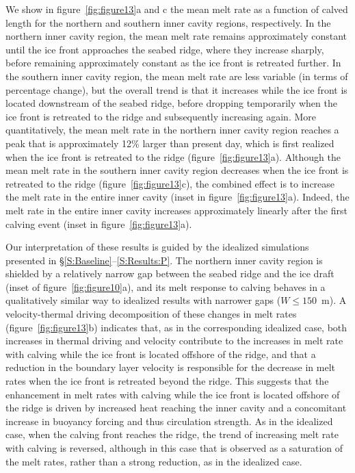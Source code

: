 \documentclass[draft]{agujournal2019}
\begin{document}
We show in figure~\ref{fig:figure13}a and c the mean melt rate as a function of calved length for the northern and southern inner cavity regions, respectively. In the northern inner cavity region, the mean melt rate remains approximately constant until the ice front approaches the seabed ridge, where they increase sharply, before remaining approximately constant as the ice front is retreated further. In the southern inner cavity region, the mean melt rate are less variable (in terms of percentage change), but the overall trend is that it increases while the ice front is located downstream of the seabed ridge, before dropping temporarily when the ice front is retreated to the ridge and subsequently increasing again.  More quantitatively, the mean melt rate in the northern inner cavity region reaches a peak that is approximately 12\% larger than present day, which is first realized when the ice front is retreated to the ridge (figure~\ref{fig:figure13}a). Although the mean melt rate in the southern inner cavity region decreases when the ice front is retreated to the ridge (figure~\ref{fig:figure13}c), the combined effect is to increase the melt rate in the entire inner cavity (inset in figure~\ref{fig:figure13}a). Indeed, the melt rate in the entire inner cavity increases approximately linearly after the first calving event (inset in figure~\ref{fig:figure13}a).



Our interpretation of these results is guided by the idealized simulations presented in \S\ref{S:Baseline}--\ref{S:Results:P}. The northern inner cavity region is shielded by a relatively narrow gap between the seabed ridge and the ice draft (inset of figure~\ref{fig:figure10}a), and its melt response to calving behaves in a qualitatively similar way to idealized results with narrower gaps ($W\leq150$~m). A velocity-thermal driving decomposition of these changes in melt rates (figure~\ref{fig:figure13}b) indicates that, as in the corresponding idealized case, both increases in thermal driving and velocity contribute to the increases in melt rate with calving while the ice front is located offshore of the ridge, and that a reduction in the boundary layer velocity is responsible for the decrease in melt rates when the ice front is retreated beyond the ridge. This suggests that the enhancement in melt rates with calving while the ice front is located offshore of the ridge is driven by increased heat reaching the inner cavity and a concomitant increase in buoyancy forcing and thus circulation strength. As in the idealized case, when the calving front reaches the ridge, the trend of increasing melt rate with calving is reversed, although in this case that is observed as a saturation of the melt rates, rather than a strong reduction, as in the idealized case.
\end{document}
